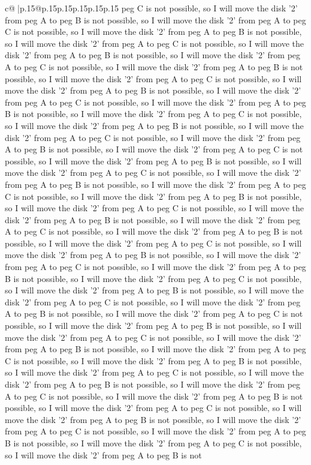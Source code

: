 \documentclass{article}
\begin{document}
{\begin{supertabular}{c@{$\;$}|p{.15\linewidth}@{}p{.15\linewidth}p{.15\linewidth}p{.15\linewidth}p{.15\linewidth}p{.15\linewidth}}
{{{peg C is not possible, so I will move the disk '2' from peg A to peg B is not possible, so I will move the disk '2' from peg A to peg C is not possible, so I will move the disk '2' from peg A to peg B is not possible, so I will move the disk '2' from peg A to peg C is not possible, so I will move the disk '2' from peg A to peg B is not possible, so I will move the disk '2' from peg A to peg C is not possible, so I will move the disk '2' from peg A to peg B is not possible, so I will move the disk '2' from peg A to peg C is not possible, so I will move the disk '2' from peg A to peg B is not possible, so I will move the disk '2' from peg A to peg C is not possible, so I will move the disk '2' from peg A to peg B is not possible, so I will move the disk '2' from peg A to peg C is not possible, so I will move the disk '2' from peg A to peg B is not possible, so I will move the disk '2' from peg A to peg C is not possible, so I will move the disk '2' from peg A to peg B is not possible, so I will move the disk '2' from peg A to peg C is not possible, so I will move the disk '2' from peg A to peg B is not possible, so I will move the disk '2' from peg A to peg C is not possible, so I will move the disk '2' from peg A to peg B is not possible, so I will move the disk '2' from peg A to peg C is not possible, so I will move the disk '2' from peg A to peg B is not possible, so I will move the disk '2' from peg A to peg C is not possible, so I will move the disk '2' from peg A to peg B is not possible, so I will move the disk '2' from peg A to peg C is not possible, so I will move the disk '2' from peg A to peg B is not possible, so I will move the disk '2' from peg A to peg C is not possible, so I will move the disk '2' from peg A to peg B is not possible, so I will move the disk '2' from peg A to peg C is not possible, so I will move the disk '2' from peg A to peg B is not possible, so I will move the disk '2' from peg A to peg C is not possible, so I will move the disk '2' from peg A to peg B is not possible, so I will move the disk '2' from peg A to peg C is not possible, so I will move the disk '2' from peg A to peg B is not possible, so I will move the disk '2' from peg A to peg C is not possible, so I will move the disk '2' from peg A to peg B is not possible, so I will move the disk '2' from peg A to peg C is not possible, so I will move the disk '2' from peg A to peg B is not possible, so I will move the disk '2' from peg A to peg C is not possible, so I will move the disk '2' from peg A to peg B is not possible, so I will move the disk '2' from peg A to peg C is not possible, so I will move the disk '2' from peg A to peg B is not possible, so I will move the disk '2' from peg A to peg C is not possible, so I will move the disk '2' from peg A to peg B is not possible, so I will move the disk '2' from peg A to peg C is not possible, so I will move the disk '2' from peg A to peg B is not possible, so I will move the disk '2' from peg A to peg C is not possible, so I will move the disk '2' from peg A to peg B is not possible, so I will move the disk '2' from peg A to peg C is not possible, so I will move the disk '2' from peg A to peg B is not }}}
\end{supertabular}}
\end{document}
